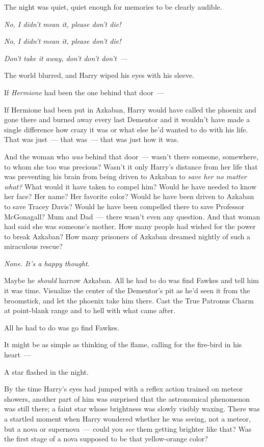 The night was quiet, quiet enough for memories to be clearly audible.

\emph{No, I didn't mean it, please don't die!}

\emph{No, I didn't mean it, please don't die!}

\emph{Don't take it away, don't don't don't~--- }

The world blurred, and Harry wiped his eyes with his sleeve.

If \emph{Hermione} had been the one behind that door~---

If Hermione had been put in Azkaban, Harry would have called the phoenix and
gone there and burned away every last Dementor and it wouldn't have made a
single difference how crazy it was or what else he'd wanted to do with his
life. That was just~--- that was~--- that was just how it was.

And the woman who \emph{was} behind that door~--- wasn't there someone,
somewhere, to whom she too was precious? Wasn't it only Harry's distance from
her life that was preventing his brain from being driven to Azkaban to
\emph{save her no matter what?} What would it have taken to compel him? Would
he have needed to know her face? Her name? Her favorite color? Would he have
been driven to Azkaban to save Tracey Davis? Would he have been compelled there
to save Professor McGonagall? Mum and Dad~--- there wasn't even any question. And
that woman had said she was someone's mother. How many people had wished for
the power to break Azkaban? How many prisoners of Azkaban dreamed nightly of
such a miraculous rescue?

\emph{None. It's a happy thought.}

Maybe he \emph{should} harrow Azkaban. All he had to do was find Fawkes and
tell him it was time. Visualize the center of the Dementor's pit as he'd seen
it from the broomstick, and let the phoenix take him there. Cast the True
Patronus Charm at point-blank range and to hell with what came after.

All he had to do was go find Fawkes.

It might be as simple as thinking of the flame, calling for the fire-bird in
his heart~---

A star flashed in the night.

By the time Harry's eyes had jumped with a reflex action trained on meteor
showers, another part of him was surprised that the astronomical phenomenon was
still there; a faint star whose brightness was slowly visibly waxing. There was
a startled moment when Harry wondered whether he was seeing, not a meteor, but
a nova or supernova~--- could you \emph{see} them getting brighter like that? Was
the first stage of a nova supposed to be that yellow-orange color?

